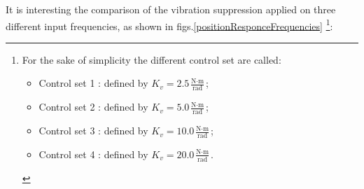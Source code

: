 


It is interesting the comparison of the vibration suppression applied on three
different input frequencies, as shown in figs.\ref{positionResponceFrequencies}
\footnote{For the sake of simplicity the different control set are called:
	\begin{itemize}
		\item Control set 1 : defined by $ K_v = 2.5 \frac{\text{N} \cdot \text{m}}{\text{rad}}$;
		\item Control set 2 : defined by $ K_v = 5.0 \frac{\text{N} \cdot \text{m}}{\text{rad}}$;
		\item Control set 3 : defined by $ K_v = 10.0 \frac{\text{N} \cdot \text{m}}{\text{rad}}$;
		\item Control set 4 : defined by $ K_v = 20.0 \frac{\text{N} \cdot \text{m}}{\text{rad}}$.	
\end{itemize}
}:

